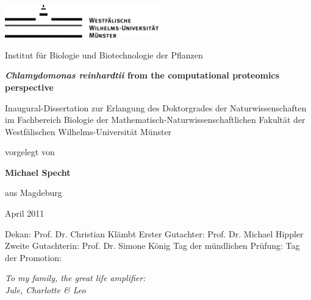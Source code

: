 \documentclass[11pt,a4paper,twoside]{report}
\begin{document}


\begin{center}
\includegraphics[width=0.5\textwidth]{figures/wwu-logo-black.png}

{\Large Institut f\"ur Biologie und Biotechnologie der Pflanzen}

\vspace*{3cm}

{\bf \Huge {\em Chlamydomonas reinhardtii} from the computational proteomics perspective}

\vspace*{3cm}

{\Large Inaugural-Dissertation zur Erlangung des Doktorgrades der
Naturwissenschaften im Fachbereich Biologie der
Mathematisch-Naturwissenschaftlichen Fakult\"at der
Westf\"alischen Wilhelms-Universit\"at M\"unster}

\vspace*{2cm}

{\Large vorgelegt von}

{\LARGE \bf Michael Specht}

{\Large aus Magdeburg}

{\LARGE April 2011}

\end{center}

\cleardoublepage

\vspace*{550pt}

Dekan: Prof. Dr. Christian Kl\"ambt \newline
Erster Gutachter: Prof. Dr. Michael Hippler \newline
Zweite Gutachterin: Prof. Dr. Simone K\"onig \newline
Tag der m\"undlichen Pr\"ufung: \newline
Tag der Promotion: \newline

\cleardoublepage

\vspace*{200pt}
\begin{flushright}
{\Large\em
To my family, the great life amplifier: \\
Jule, Charlotte \& Leo
}
\end{flushright}
\end{document}
